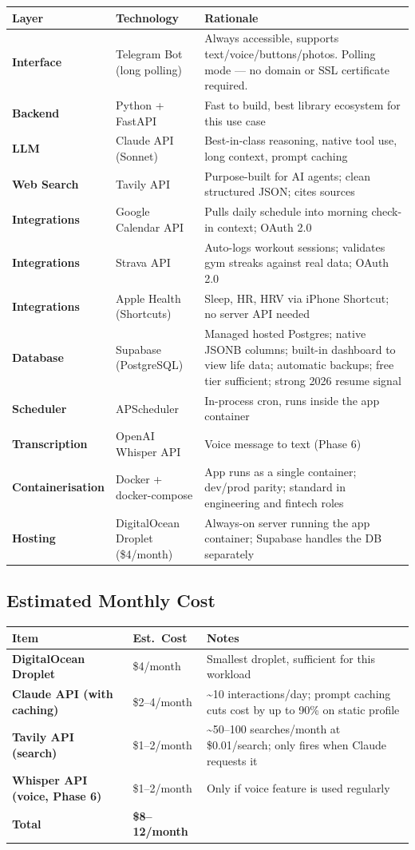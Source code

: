 \documentclass[12pt, a4paper]{article}
\begin{document}
\begin{longtable}{>{\bfseries}p{4cm} p{5cm} p{5cm}}
\toprule
Layer & Technology & Rationale \\
\midrule
Interface & Telegram Bot (long polling) & Always accessible, supports text/voice/buttons/photos. Polling mode --- no domain or SSL certificate required. \\
Backend & Python + FastAPI & Fast to build, best library ecosystem for this use case \\
LLM & Claude API (Sonnet) & Best-in-class reasoning, native tool use, long context, prompt caching \\
Web Search & Tavily API & Purpose-built for AI agents; clean structured JSON; cites sources \\
Integrations & Google Calendar API & Pulls daily schedule into morning check-in context; OAuth 2.0 \\
Integrations & Strava API & Auto-logs workout sessions; validates gym streaks against real data; OAuth 2.0 \\
Integrations & Apple Health (Shortcuts) & Sleep, HR, HRV via iPhone Shortcut; no server API needed \\
Database & Supabase (PostgreSQL) & Managed hosted Postgres; native JSONB columns; built-in dashboard to view life data; automatic backups; free tier sufficient; strong 2026 resume signal \\
Scheduler & APScheduler & In-process cron, runs inside the app container \\
Transcription & OpenAI Whisper API & Voice message to text (Phase 6) \\
Containerisation & Docker + docker-compose & App runs as a single container; dev/prod parity; standard in engineering and fintech roles \\
Hosting & DigitalOcean Droplet (\$4/month) & Always-on server running the app container; Supabase handles the DB separately \\
\bottomrule
\end{longtable}

\subsection{Estimated Monthly Cost}

\begin{longtable}{>{\bfseries}p{5cm} p{3cm} p{6cm}}
\toprule
Item & Est.\ Cost & Notes \\
\midrule
DigitalOcean Droplet & \$4/month & Smallest droplet, sufficient for this workload \\
Claude API (with caching) & \$2--4/month & \textasciitilde10 interactions/day; prompt caching cuts cost by up to 90\% on static profile \\
Tavily API (search) & \$1--2/month & \textasciitilde50--100 searches/month at \$0.01/search; only fires when Claude requests it \\
Whisper API (voice, Phase 6) & \$1--2/month & Only if voice feature is used regularly \\
\textbf{Total} & \textbf{\$8--12/month} & \\
\bottomrule
\end{longtable}
\end{document}

